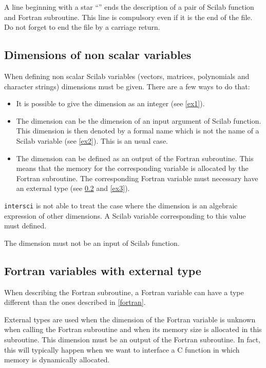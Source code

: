 A line beginning with a star ``\T{*}'' ends the description of a pair of
Scilab function and Fortran subroutine. This line is compulsory even if it is
the end of the file. Do not forget to end the file by a carriage return.

\subsection{Dimensions of non scalar variables}
\label{dimensions}

When defining non scalar Scilab variables (vectors, matrices, polynomials and
character strings) dimensions must be given. There are a few ways to do that:

\begin{itemize}
  \item It is possible to give the dimension as an integer (see \ref{ex1}).
  \item The dimension can be the dimension of an input argument of Scilab
function. This dimension is then denoted by a formal name which is not the
name of a Scilab variable (see \ref{ex2}). This is an usual case.
  \item The dimension can be defined as an output of the Fortran subroutine.
This means that the memory for the corresponding variable is allocated by the
Fortran subroutine. The corresponding Fortran variable must necessary have an
external type (see \ref{external} and \ref{ex3}).
\end{itemize}

{\tt intersci} is not able to treat the case where the dimension is an algebraic
expression of other dimensions. A Scilab variable corresponding to this value
must defined.

The dimension must not be an input of Scilab function.

\subsection{Fortran variables with external type}
\label{external}

When describing the Fortran subroutine, a Fortran variable can have a type
different than the ones described in \ref{fortran}.

External types are used when the dimension of the Fortran variable is
unknown when calling the Fortran subroutine and when its memory size is
allocated in this subroutine. This dimension must be an output of the Fortran
subroutine. In fact, this will typically happen when we want to interface a C
function in which memory is dynamically allocated.

